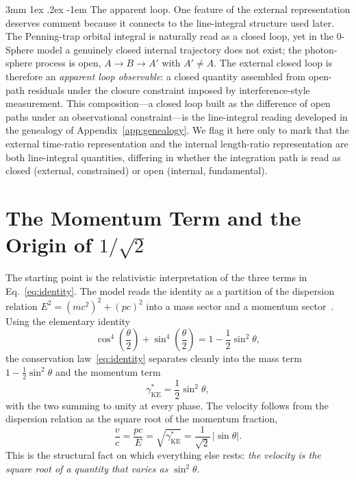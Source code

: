 \documentclass[%
 reprint, amsmath,amssymb, aps, prb, ]{revtex4-2}
\makeatletter
\numberwithin{equation}{section}
\renewcommand\paragraph{%
  \@startsection{paragraph}{4}{\z@}%
    {3mm \@plus 1ex \@minus .2ex}%
    {-1em}%
    {\normalfont\normalsize\itshape}}
\newcommand{\gKE}{\gamma^{*}_{\text{KE}}}
\makeatother
\begin{document}
\paragraph{The apparent loop.}
One feature of the external representation deserves comment because it connects to the line-integral structure used later. The Penning-trap orbital integral is naturally read as a closed loop, yet in the 0-Sphere model a genuinely closed internal trajectory does not exist; the photon-sphere process is open, $A \to B \to A'$ with $A' \neq A$. The external closed loop is therefore an \emph{apparent loop observable}: a closed quantity assembled from open-path residuals under the closure constraint imposed by interference-style measurement. This composition---a closed loop built as the difference of open paths under an observational constraint---is the line-integral reading developed in the genealogy of Appendix~\ref{app:genealogy}. We flag it here only to mark that the external time-ratio representation and the internal length-ratio representation are both line-integral quantities, differing in whether the integration path is read as closed (external, constrained) or open (internal, fundamental).

\section{The Momentum Term and the Origin of \texorpdfstring{$1/\sqrt{2}$}{1/sqrt2}}
\label{sec:momentum}

The starting point is the relativistic interpretation of the three terms in Eq.~\eqref{eq:identity}. The model reads the identity as a partition of the dispersion relation $E^2=(mc^2)^2+(pc)^2$ into a mass sector and a momentum sector~\cite{hanamura07}. Using the elementary identity
\begin{equation}
\cos^4\!\left(\frac{\theta}{2}\right) + \sin^4\!\left(\frac{\theta}{2}\right) = 1 - \frac{1}{2}\sin^2\theta,
\label{eq:tpe-reduce}
\end{equation}
the conservation law~\eqref{eq:identity} separates cleanly into the mass term $1-\tfrac{1}{2}\sin^2\theta$ and the momentum term
\begin{equation}
\gKE = \frac{1}{2}\sin^2\theta,
\label{eq:momentum-term}
\end{equation}
with the two summing to unity at every phase. The velocity follows from the dispersion relation as the square root of the momentum fraction,
\begin{equation}
\frac{v}{c} = \frac{pc}{E} = \sqrt{\gKE} = \frac{1}{\sqrt{2}}\,\lvert\sin\theta\rvert.
\label{eq:velocity-sqrt}
\end{equation}
This is the structural fact on which everything else rests: \emph{the velocity is the square root of a quantity that varies as $\sin^2\theta$}.
\end{document}
